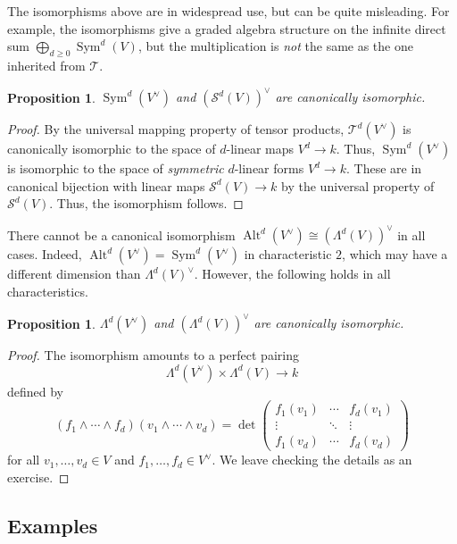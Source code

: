 \documentclass[12pt]{article}
\theoremstyle{plain}
\newtheorem{proposition}[theorem]{Proposition}
\theoremstyle{definition}
\theoremstyle{remark}
\numberwithin{equation}{section}
\begin{document}
The isomorphisms above are in widespread use, but can be quite
misleading.  For example, the isomorphisms give a
graded algebra structure on the infinite direct sum
$\bigoplus_{d\ge 0}\operatorname{Sym}^d(V)$,
but the multiplication is \emph{not} the same as the one inherited from
$\mathcal{T}$.

\begin{proposition}
$\operatorname{Sym}^d(V^\vee)$ and $\left(\mathcal{S}^d(V)\right)^\vee$
are canonically isomorphic.
\end{proposition}

\begin{proof}
By the universal mapping property of tensor products,
$\mathcal{T}^d(V^\vee)$ is canonically isomorphic to the space of
$d$-linear maps $V^d \to k$.
Thus, $\operatorname{Sym}^d(V^\vee)$ is isomorphic to the
space of \emph{symmetric} $d$-linear forms $V^d \to k$.
These are in canonical bijection with linear maps
$\mathcal{S}^d(V) \to k$ by the universal property of
$\mathcal{S}^d(V)$.  Thus, the isomorphism follows.
\end{proof}

There cannot be a canonical isomorphism
$\operatorname{Alt}^d(V^\vee) \cong \left(\Lambda^d(V)\right)^\vee$
in all cases.  Indeed,
$\operatorname{Alt}^d(V^\vee) = \operatorname{Sym}^d(V^\vee)$
in characteristic $2$, which may have a different dimension than
$\Lambda^d(V)^\vee$.
However, the following holds in all characteristics.

\begin{proposition}
$\Lambda^d(V^\vee)$ and $\left(\Lambda^d(V)\right)^\vee$
are canonically isomorphic.
\end{proposition}

\begin{proof}
The isomorphism amounts to a perfect pairing
\[
\Lambda^d(V^\vee) \times \Lambda^d(V) \to k
\]
defined by
\[
(f_1 \wedge \cdots \wedge f_d)(v_1 \wedge \cdots \wedge v_d)
= \det \begin{pmatrix}
f_1(v_1) & \cdots & f_d(v_1)\\
\vdots & \ddots & \vdots\\
f_1(v_d) & \cdots & f_d(v_d)
\end{pmatrix} 
\]
for all $v_1,\ldots, v_d \in V$ and $f_1,\ldots, f_d \in V^\vee$.
We leave checking the details as an exercise.
\end{proof}

\subsection{Examples}
\end{document}
